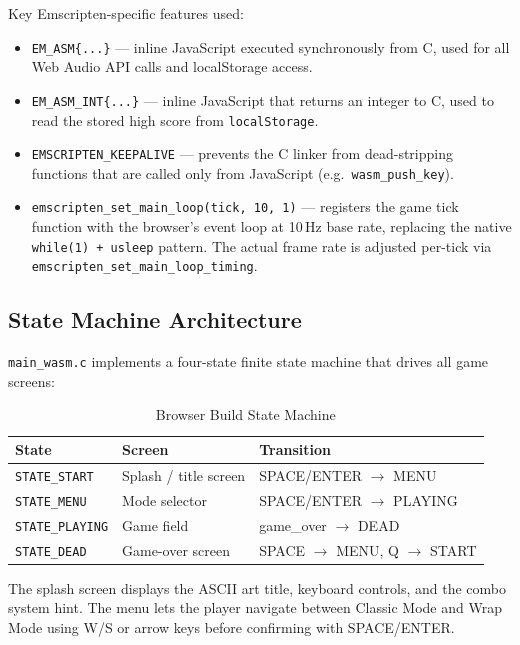 \documentclass[conference]{IEEEtran}
\begin{document}
Key Emscripten-specific features used:

\begin{itemize}
  \item \texttt{EM\_ASM\{...\}} --- inline JavaScript executed synchronously
        from C, used for all Web Audio API calls and localStorage access.
  \item \texttt{EM\_ASM\_INT\{...\}} --- inline JavaScript that returns an
        integer to C, used to read the stored high score from
        \texttt{localStorage}.
  \item \texttt{EMSCRIPTEN\_KEEPALIVE} --- prevents the C linker from
        dead-stripping functions that are called only from JavaScript (e.g.\
        \texttt{wasm\_push\_key}).
  \item \texttt{emscripten\_set\_main\_loop(tick, 10, 1)} --- registers the
        game tick function with the browser's event loop at 10\,Hz base rate,
        replacing the native \texttt{while(1) + usleep} pattern. The actual
        frame rate is adjusted per-tick via
        \texttt{emscripten\_set\_main\_loop\_timing}.
\end{itemize}

\subsection{State Machine Architecture}

\texttt{main\_wasm.c} implements a four-state finite state machine that
drives all game screens:

\begin{table}[h]
\centering
\caption{Browser Build State Machine}
\begin{tabular}{lll}
\toprule
\textbf{State} & \textbf{Screen} & \textbf{Transition} \\
\midrule
\texttt{STATE\_START}   & Splash / title screen  & SPACE/ENTER $\to$ MENU \\
\texttt{STATE\_MENU}    & Mode selector          & SPACE/ENTER $\to$ PLAYING \\
\texttt{STATE\_PLAYING} & Game field             & game\_over $\to$ DEAD \\
\texttt{STATE\_DEAD}    & Game-over screen       & SPACE $\to$ MENU, Q $\to$ START \\
\bottomrule
\end{tabular}
\end{table}

The splash screen displays the ASCII art title, keyboard controls, and the
combo system hint. The menu lets the player navigate between Classic Mode and
Wrap Mode using W/S or arrow keys before confirming with SPACE/ENTER.
\end{document}
